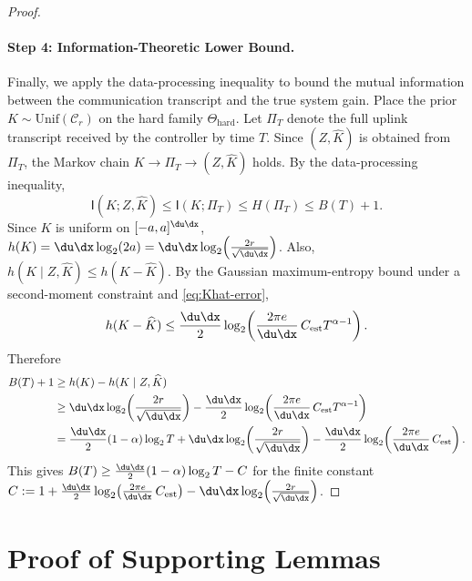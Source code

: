 \documentclass[11pt,journal,onecolumn]{IEEEtran}
\newcommand{\I}{\mathsf{I}}
\begin{document}
\begin{proof}
\paragraph{Step 4: Information-Theoretic Lower Bound.} Finally, we apply the data-processing inequality to bound the mutual information between the communication transcript and the true system gain. Place the prior $K\sim \mathrm{Unif}(\mathcal{C}_r)$ on the hard family $\Theta_{\mathrm{hard}}$. Let $\Pi_T$ denote the full uplink transcript received by the controller by time $T$.
Since $(Z,\widehat K)$ is obtained from $\Pi_T$, the Markov chain
$K \to \Pi_T \to (Z,\widehat K)$
holds. By the data-processing inequality,
\begin{equation}
\label{eq:info-upper-converse}
    \I(K;Z,\widehat K)
    \le
    \I(K;\Pi_T)
    \le
    H(\Pi_T)
    \le
    B(T)+1.
\end{equation}
Since $K$ is uniform on $[-a,a]^{\du\dx}$,
$h(K) = \du\dx\log_2(2a) = \du\dx\log_2\!\left(\frac{2r}{\sqrt{\du\dx}}\right)$.
Also,
$h(K\mid Z,\widehat K) \le h(K-\widehat K)$.
By the Gaussian maximum-entropy bound under a second-moment constraint and \eqref{eq:Khat-error},
\begin{equation}\label{eq:gauss-maxent}
    h(K-\widehat K)
    \le
    \frac{\du\dx}{2}\log_2\!\left(\frac{2\pi e}{\du\dx}\,C_{\mathrm{est}}T^{\alpha-1}\right).
\end{equation}
Therefore
\begin{align}\label{eq:final-bound}
    B(T)+1
    &\ge
    h(K)-h(K\mid Z,\widehat K) \nonumber\\
    &\ge
    \du\dx\log_2\!\left(\frac{2r}{\sqrt{\du\dx}}\right)
    - \frac{\du\dx}{2}\log_2\!\left(\frac{2\pi e}{\du\dx}\,C_{\mathrm{est}}T^{\alpha-1}\right) \nonumber\\
    &=
    \frac{\du\dx}{2}(1-\alpha)\log_2 T
    + \du\dx\log_2\!\left(\frac{2r}{\sqrt{\du\dx}}\right)
    - \frac{\du\dx}{2}\log_2\!\left(\frac{2\pi e}{\du\dx}\,C_{\mathrm{est}}\right).
\end{align}
This gives $B(T) \ge \frac{\du\dx}{2}(1-\alpha)\log_2 T - C$
for the finite constant
$C := 1 + \frac{\du\dx}{2}\log_2\!\left(\frac{2\pi e}{\du\dx}\,C_{\mathrm{est}}\right) - \du\dx\log_2\!\left(\frac{2r}{\sqrt{\du\dx}}\right)$.
\end{proof}

\section{Proof of Supporting Lemmas}
\label{app:lemmas}
\end{document}
